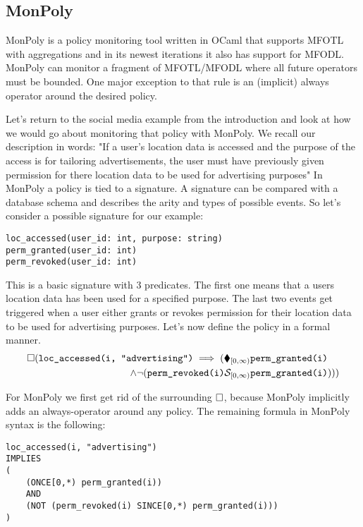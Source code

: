 \subsection{MonPoly}
MonPoly \cite{Basin2017} is a policy monitoring tool written in OCaml that supports MFOTL with aggregations and in its newest iterations it also has support for MFODL.
MonPoly can monitor a fragment of MFOTL/MFODL where all future operators must be bounded.
One major exception to that rule is an (implicit) always operator around the desired policy.

Let's return to the social media example from the introduction and look at how we would go about monitoring that policy with MonPoly.
We recall our description in words:
    "If a user's location data is accessed and the purpose of the access is for tailoring advertisements, the user must have previously given permission for there location data to be used for advertising purposes"
In MonPoly a policy is tied to a signature.
A signature can be compared with a database schema and describes the arity and types of possible events.
So let's consider a possible signature for our example: 

\begin{verbatim}
loc_accessed(user_id: int, purpose: string)
perm_granted(user_id: int)
perm_revoked(user_id: int)
\end{verbatim}

This is a basic signature with 3 predicates.
The first one means that a users location data has been used for a specified purpose.
The last two events get triggered when a user either grants or revokes permission for their location data to be used for advertising purposes.
Let's now define the policy in a formal manner.
\begin{align*}
    \square (\texttt{loc\_accessed(i, "advertising")}
    \implies (\blacklozenge_{[0,\infty)} &\texttt{perm\_granted(i)} \\
         \land  \neg (\texttt{perm\_revoked(i)} \mathcal{S}_{[0,\infty)} 
            &\texttt{perm\_granted(i)})))
\end{align*}

For MonPoly we first get rid of the surrounding $\square$, because MonPoly implicitly adds an always-operator around any policy.
The remaining formula in MonPoly syntax is the following:

\begin{verbatim}
loc_accessed(i, "advertising")
IMPLIES 
(
    (ONCE[0,*) perm_granted(i)) 
    AND 
    (NOT (perm_revoked(i) SINCE[0,*) perm_granted(i)))
)
\end{verbatim}

